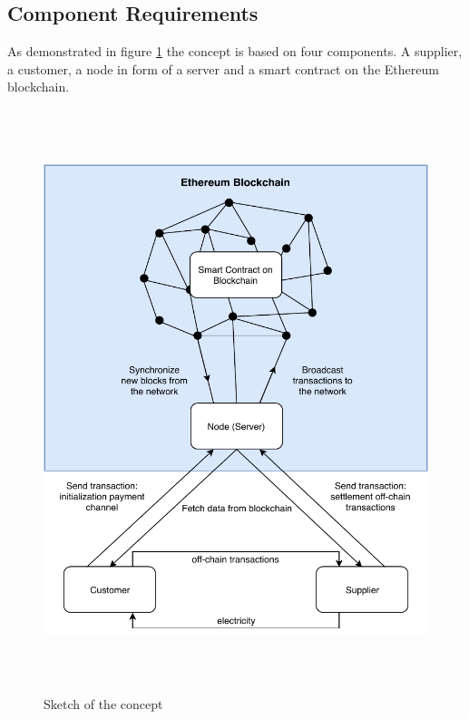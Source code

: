 \subsection{Component Requirements}
As demonstrated in figure \ref{fig:concept} the concept is based on four components.
A supplier, a customer, a node in form of a server and a smart contract on the Ethereum blockchain.
\\
\begin{figure}[H]
  \begin{center}
    \includegraphics[height=17cm]{img/concept.pdf}
    \caption{Sketch of the concept}
    \label{fig:concept}
  \end{center}
\end{figure}

